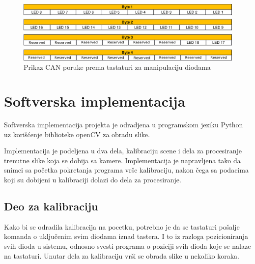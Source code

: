 \documentclass[a4paper,12pt, projekat]{etf}
\begin{document}
        \begin{figure}[htb]
            \centering
            \includegraphics[scale=0.3]{canmsg.png}
            \caption{Prikaz CAN poruke prema tastaturi za manipulaciju diodama}
            \label{fig:keyboardmsg}
        \end{figure}

        \newpage

        \chapter{Softverska implementacija}
        Softverska implementacija projekta je odradjena u programskom jeziku
        Python uz kori\v{s}\'{c}enje biblioteke openCV za obradu slike.

        Implementacija je podeljena u dva dela, kalibraciju scene i dela za
        procesiranje trenutne slike koja se dobija sa kamere. Implementacija je
        napravljena tako da snimci sa po\v{c}etka pokretanja programa vr\v{s}e
        kalibraciju, nakon \v{c}ega sa podacima koji su dobijeni u kalibraciji
        dolazi do dela za procesiranje.

        \section{Deo za kalibraciju}
        Kako bi se odradila kalibracija na pocetku, potrebno je da se tastaturi
        po\v{s}alje komanda o uklju\v{c}enim svim diodama iznad tastera. I to iz
        razloga pozicioniranja svih dioda u sistemu, odnosno svesti programa o
        poziciji svih dioda koje se nalaze na tastaturi. Unutar dela za
        kalibraciju vr\v{s}i se obrada slike u nekoliko koraka.
\end{document}
